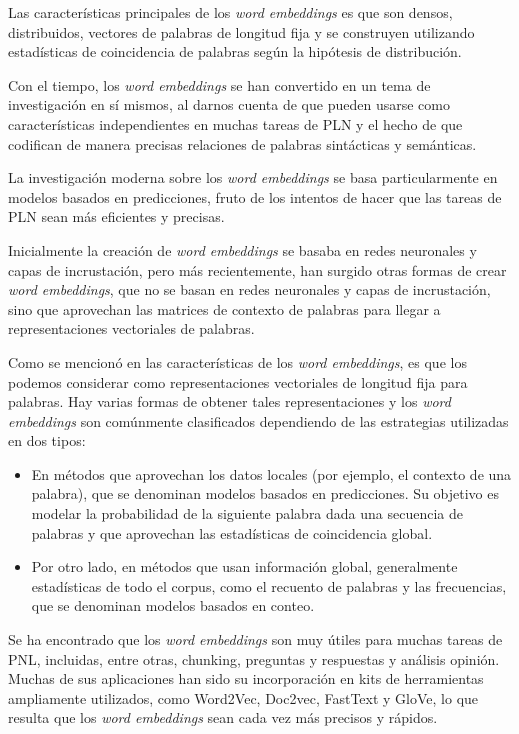 \documentclass[titlepage]{article}
\begin{document}
Las características principales de los \textit{word embeddings} es que son densos, distribuidos, vectores de palabras de longitud fija y se construyen utilizando estadísticas de coincidencia de palabras según la hipótesis de distribución.

Con el tiempo, los \textit{word embeddings} se han convertido en un tema de investigación en sí mismos, al darnos cuenta de que pueden usarse como características independientes en muchas tareas de PLN y el hecho de que codifican de manera precisas relaciones de palabras sintácticas y semánticas.

La investigación moderna sobre los \textit{word embeddings} se basa particularmente en modelos basados en predicciones, fruto de los intentos de hacer que las tareas de PLN sean más eficientes y precisas. 

Inicialmente la creación de \textit{word embeddings} se basaba en redes neuronales y capas de incrustación, pero más recientemente, han surgido otras formas de crear \textit{word embeddings}, que no se basan en redes neuronales y capas de incrustación, sino que aprovechan las matrices de contexto de palabras para llegar a representaciones vectoriales de palabras. 

Como se mencionó en las características de los \textit{word embeddings},  es que los podemos considerar como representaciones vectoriales de longitud fija para palabras. Hay varias formas de obtener tales representaciones y los \textit{word embeddings} son comúnmente clasificados dependiendo de las estrategias utilizadas en dos tipos:
\begin{itemize}
	\item En métodos que aprovechan los datos locales (por ejemplo, el contexto de una palabra), que se denominan modelos basados en predicciones. Su objetivo es modelar la probabilidad de la siguiente palabra dada una secuencia de palabras y que aprovechan las estadísticas de coincidencia global.
	\item Por otro lado, en métodos que usan información global, generalmente estadísticas de todo el corpus, como el recuento de palabras y las frecuencias, que se denominan modelos basados en conteo. 
\end{itemize}

Se ha encontrado que los \textit{word embeddings} son muy útiles para muchas tareas de PNL, incluidas, entre otras, chunking, preguntas y respuestas y análisis opinión. Muchas de sus aplicaciones han sido su incorporación en kits de herramientas ampliamente utilizados, como Word2Vec, Doc2vec, FastText y GloVe, lo que resulta que los \textit{word embeddings} sean cada vez más precisos y rápidos. \label{aplicaciones}
\end{document}
